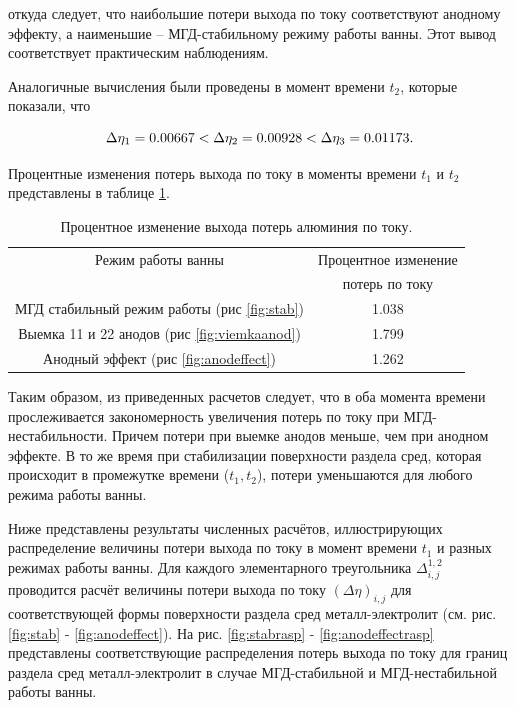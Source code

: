 \documentclass[pdflatex,sn-mathphys-gost]{pmi-jnl}
\begin{document}
откуда следует, что наибольшие потери выхода по току соответствуют анодному эффекту, а наименьшие – МГД-стабильному режиму работы ванны. Этот вывод соответствует практическим наблюдениям.

Аналогичные вычисления были проведены в момент времени $t_2$, которые показали, что

\begin{equation}
	\Delta\eta_1 = 0.00667 < \Delta\eta_2 = 0.00928 < \Delta\eta_3 = 0.01173. \notag
\end{equation}

Процентные изменения потерь выхода по току в моменты времени $t_1$ и $t_2$ представлены в таблице \ref{table:ismineniep}. 

\begin{table}[h]
\centering
\caption{Процентное изменение выхода потерь алюминия по току.}
\begin{tabular}{|c|c|}
\hline
Режим работы ванны & Процентное изменение \\
 					& потерь по току \\
\hline
МГД стабильный режим работы (рис \ref{fig:stab}) & 1.038	\\
\hline
Выемка 11 и 22 анодов (рис \ref{fig:viemkaanod}) &	1.799\\
\hline
Анодный эффект (рис \ref{fig:anodeffect}) & 1.262	\\
\hline
\end{tabular}
\label{table:ismineniep}
\end{table}

Таким образом, из приведенных расчетов следует, что в оба момента времени прослеживается закономерность увеличения потерь по току при МГД-нестабильности. Причем потери при выемке анодов меньше, чем при анодном эффекте. В то же время при стабилизации поверхности раздела сред, которая происходит в промежутке времени ($t_1, t_2$), потери уменьшаются для любого режима работы ванны.

Ниже представлены результаты численных расчётов, иллюстрирующих распределение величины потери выхода по току в момент времени $t_1$ и разных режимах работы ванны. Для каждого элементарного треугольника $\Delta^{1,2}_{i,j}$ проводится расчёт величины потери выхода по току $(\Delta\eta)_{i,j}$ для соответствующей формы поверхности раздела сред металл-электролит (см. рис. \ref{fig:stab} - \ref{fig:anodeffect}). На рис. \ref{fig:stabrasp} - \ref{fig:anodeffectrasp} представлены соответствующие распределения потерь выхода по току для границ раздела сред металл-электролит в случае МГД-стабильной и МГД-нестабильной работы ванны.
\end{document}
